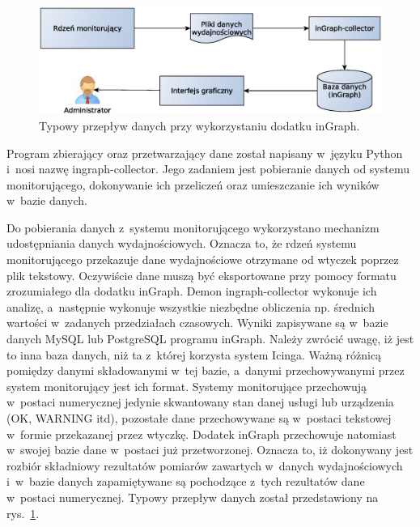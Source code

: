 \begin{figure}[ht]
  \caption{Typowy przepływ danych przy wykorzystaniu dodatku inGraph.}
  \label{fig:inGraphFlow}
\includegraphics[width=1\textwidth]{img/ingraphFlow}
\end{figure}

Program zbierający oraz przetwarzający dane został napisany w~języku
Python i~nosi nazwę ingraph-collector. Jego zadaniem jest pobieranie
danych od systemu monitorującego, dokonywanie ich przeliczeń oraz
umieszczanie ich wyników w~bazie danych.

Do pobierania danych z~systemu monitorującego wykorzystano mechanizm
udostępniania danych wydajnościowych. Oznacza to, że rdzeń systemu
monitorującego przekazuje dane wydajnościowe otrzymane od wtyczek
poprzez plik tekstowy. Oczywiście dane muszą być eksportowane przy
pomocy formatu zrozumiałego dla dodatku inGraph. Demon
ingraph-collector wykonuje ich analizę, a~następnie wykonuje wszystkie
niezbędne obliczenia np. średnich wartości w~zadanych przedziałach
czasowych. Wyniki zapisywane są w~bazie danych MySQL lub PostgreSQL
programu inGraph. Należy zwrócić uwagę, iż jest to inna baza danych,
niż ta z~której korzysta system Icinga. Ważną różnicą pomiędzy danymi
składowanymi w~tej bazie, a~danymi przechowywanymi przez system
monitorujący jest ich format. Systemy monitorujące przechowują
w~postaci numerycznej jedynie skwantowany stan danej usługi lub
urządzenia (OK, WARNING itd), pozostałe dane przechowywane są
w~postaci tekstowej w~formie przekazanej przez wtyczkę. Dodatek
inGraph przechowuje natomiast w~swojej bazie dane w~postaci już
przetworzonej. Oznacza to, iż dokonywany jest rozbiór składniowy
rezultatów pomiarów zawartych w~danych wydajnościowych i~w~bazie
danych zapamiętywane są pochodzące z~tych rezultatów dane w~postaci
numerycznej. Typowy przepływ danych został przedstawiony
na rys.~\ref{fig:inGraphFlow}.

